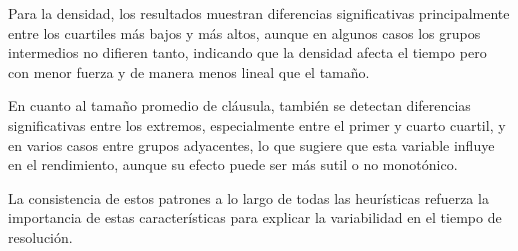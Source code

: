 Para la densidad, los resultados muestran diferencias significativas principalmente entre los cuartiles más bajos y más altos, aunque en algunos casos los grupos intermedios no difieren tanto, indicando que la densidad afecta el tiempo pero con menor fuerza y de manera menos lineal que el tamaño.

En cuanto al tamaño promedio de cláusula, también se detectan diferencias significativas entre los extremos, especialmente entre el primer y cuarto cuartil, y en varios casos entre grupos adyacentes, lo que sugiere que esta variable influye en el rendimiento, aunque su efecto puede ser más sutil o no monotónico.

La consistencia de estos patrones a lo largo de todas las heurísticas refuerza la importancia de estas características para explicar la variabilidad en el tiempo de resolución.

